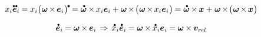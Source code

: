 \begin{otherlanguage}{russian}
\nopagebreak\begin{equation*}
x_i \mathdotdotabove{\bm{e}}_i \hspace{-0.1ex}
= x_i \bigl( \hspace{.1ex} \bm{\omega} \hspace{-0.2ex} \times \hspace{-0.2ex} \bm{e}_i \hspace{.1ex} \bigr)^{ \hspace{-0.15ex} \tikz[baseline=-0.2ex] \draw[black, fill=black] (0,0) circle (.28ex); } \hspace{-0.15ex}
= \mathdotabove{\bm{\omega}} \hspace{-0.12ex} \times \hspace{-0.12ex} x_i \bm{e}_i
+ \bm{\omega} \hspace{-0.2ex} \times \hspace{-0.33ex} \bigl( \hspace{.1ex} \bm{\omega} \hspace{-0.2ex} \times \hspace{-0.2ex} x_i \bm{e}_i \hspace{.1ex} \bigr) \hspace{-0.15ex}
= \mathdotabove{\bm{\omega}} \hspace{-0.12ex} \times \hspace{-0.12ex} \bm{x}
+ \hspace{.1ex} \bm{\omega} \hspace{-0.2ex} \times \hspace{-0.33ex} \bigl( \hspace{.1ex} \bm{\omega} \hspace{-0.2ex} \times \hspace{-0.2ex} \bm{x} \hspace{.1ex} \bigr)
\end{equation*}

\nopagebreak\begin{equation*}
\mathdotabove{\bm{e}}_i \hspace{-0.1ex} = \bm{\omega} \hspace{-0.1ex} \times \hspace{-0.12ex} \bm{e}_i
\hspace{.33ex} \Rightarrow \hspace{.4ex}
\mathdotabove{x}_i \mathdotabove{\bm{e}}_i \hspace{-0.1ex}
= \bm{\omega} \hspace{-0.1ex} \times \hspace{-0.1ex} \mathdotabove{x}_i \bm{e}_i \hspace{-0.1ex}
= \bm{\omega} \hspace{-0.1ex} \times \hspace{-0.1ex} \bm{v}_{r\kern-0.1exel}
\end{equation*}


\end{otherlanguage}
